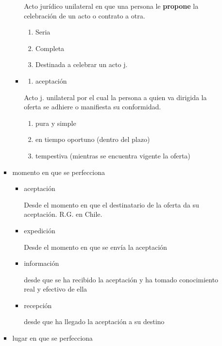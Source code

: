 \documentclass[]{article}
\providecommand{\tightlist}{%
  \setlength{\itemsep}{0pt}\setlength{\parskip}{0pt}}
\begin{document}
\begin{itemize}
\begin{itemize}
\begin{itemize}
\begin{itemize}
        Acto jurídico unilateral en que una persona le \textbf{propone}
        la celebración de un acto o contrato a otra.

        \begin{enumerate}
        \def\labelenumi{\arabic{enumi}.}
        \tightlist
        \item
          Seria
        \item
          Completa
        \item
          Destinada a celebrar un acto j.
        \end{enumerate}
      \item
        \begin{enumerate}
        \def\labelenumi{\alph{enumi})}
        \setcounter{enumi}{1}
        \tightlist
        \item
          aceptación
        \end{enumerate}

        Acto j. unilateral por el cual la persona a quien va dirigida la
        oferta se adhiere o manifiesta su conformidad.

        \begin{enumerate}
        \def\labelenumi{\arabic{enumi}.}
        \tightlist
        \item
          pura y simple
        \item
          en tiempo oportuno (dentro del plazo)
        \item
          tempestiva (mientras se encuentra vigente la oferta)
        \end{enumerate}
      \end{itemize}
    \item
      momento en que se perfecciona

      \begin{itemize}
      \item
        aceptación

        Desde el momento en que el destinatario de la oferta da su
        aceptación. R.G. en Chile.
      \item
        expedición

        Desde el momento en que se envía la aceptación
      \item
        información

        desde que se ha recibido la aceptación y ha tomado conocimiento
        real y efectivo de ella
      \item
        recepción

        desde que ha llegado la aceptación a su destino
      \end{itemize}
    \item
      lugar en que se perfecciona


\end{itemize}
\end{itemize}
\end{itemize}
\end{document}
